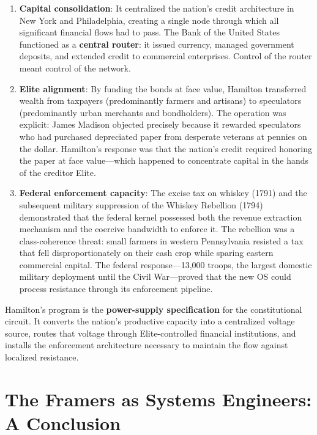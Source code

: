 \begin{enumerate}
    \item \textbf{Capital consolidation}: It centralized the nation's credit architecture in New York and Philadelphia, creating a single node through which all significant financial flows had to pass. The Bank of the United States functioned as a \textbf{central router}: it issued currency, managed government deposits, and extended credit to commercial enterprises. Control of the router meant control of the network.
    
    \item \textbf{Elite alignment}: By funding the bonds at face value, Hamilton transferred wealth from taxpayers (predominantly farmers and artisans) to speculators (predominantly urban merchants and bondholders). The operation was explicit: James Madison objected precisely because it rewarded speculators who had purchased depreciated paper from desperate veterans at pennies on the dollar. Hamilton's response was that the nation's credit required honoring the paper at face value---which happened to concentrate capital in the hands of the creditor Elite.
    
    \item \textbf{Federal enforcement capacity}: The excise tax on whiskey (1791) and the subsequent military suppression of the Whiskey Rebellion (1794) demonstrated that the federal kernel possessed both the revenue extraction mechanism and the coercive bandwidth to enforce it. The rebellion was a class-coherence threat: small farmers in western Pennsylvania resisted a tax that fell disproportionately on their cash crop while sparing eastern commercial capital. The federal response---13,000 troops, the largest domestic military deployment until the Civil War---proved that the new OS could process resistance through its enforcement pipeline.
\end{enumerate}

Hamilton's program is the \textbf{power-supply specification} for the constitutional circuit. It converts the nation's productive capacity into a centralized voltage source, routes that voltage through Elite-controlled financial institutions, and installs the enforcement architecture necessary to maintain the flow against localized resistance.

\section{The Framers as Systems Engineers: A Conclusion}

